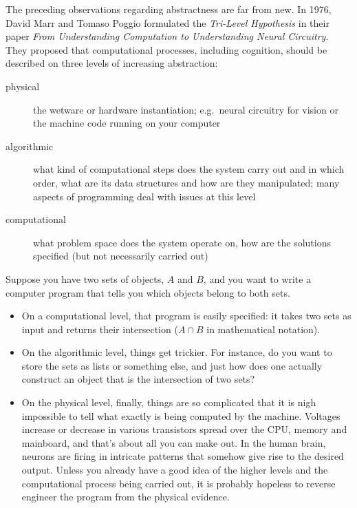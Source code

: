 The preceding observations regarding abstractness are far from new.
In 1976, David Marr and Tomaso Poggio formulated the \emph{Tri-Level Hypothesis} in their paper \emph{From Understanding Computation to Understanding Neural Circuitry}.
They proposed that computational processes, including cognition, should be described on three levels of increasing abstraction:
%
\begin{description}
    \item[physical] the wetware or hardware instantiation; e.g.\ neural circuitry for vision or the machine code running on your computer
    \item[algorithmic] what kind of computational steps does the system carry out and in which order, what are its data structures and how are they manipulated; many aspects of programming deal with issues at this level
    \item[computational] what problem space does the system operate on, how are the solutions specified (but not necessarily carried out)
\end{description}
%
\begin{examplebox}
    Suppose you have two sets of objects, $A$ and $B$, and you want to write a computer program that tells you which objects belong to both sets.
    \begin{itemize}
        \item On a computational level, that program is easily specified: it takes two sets as input and returns their intersection ($A \cap B$ in mathematical notation).
        \item On the algorithmic level, things get trickier.
        For instance, do you want to store the sets as lists or something else, and just how does one actually construct an object that is the intersection of two sets?
    \item On the physical level, finally, things are so complicated that it is nigh impossible to tell what exactly is being computed by the machine.
        Voltages increase or decrease in various transistors spread over the CPU, memory and mainboard, and that's about all you can make out.
        In the human brain, neurons are firing in intricate patterns that somehow give rise to the desired output.
        Unless you already have a good idea of the higher levels and the computational process being carried out, it is probably hopeless to reverse engineer the program from the physical evidence.
    \end{itemize}\label{ex:formal_intersection}
\end{examplebox}

